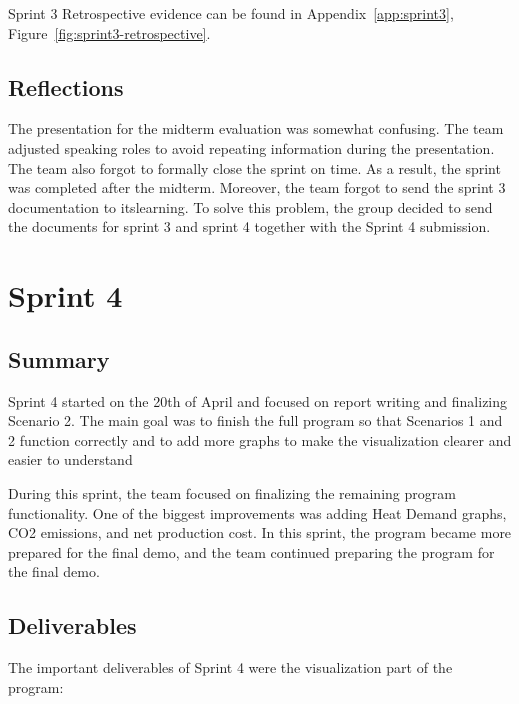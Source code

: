 Sprint 3 Retrospective evidence can be found in Appendix~\ref{app:sprint3}, Figure~\ref{fig:sprint3-retrospective}.

 

\subsection*{Reflections}

The presentation for the midterm evaluation was somewhat confusing. The team adjusted speaking roles to avoid repeating information during the presentation. The team also forgot to formally close the sprint on time. As a result, the sprint was completed after the midterm. Moreover, the team forgot to send the sprint 3 documentation to itslearning. To solve this problem, the group decided to send the documents for sprint 3 and sprint 4 together with the Sprint 4 submission.

 


\section{Sprint 4}

 

\subsection*{Summary}

Sprint 4 started on the 20th of April and focused on report writing and finalizing Scenario 2. The main goal was to finish the full program so that Scenarios 1 and 2 function correctly and to add more graphs to make the visualization clearer and easier to understand

During this sprint, the team focused on finalizing the remaining program functionality. One of the biggest improvements was adding Heat Demand graphs, CO2 emissions, and net production cost. In this sprint, the program became more prepared for the final demo, and the team continued preparing the program for the final demo.

\subsection*{Deliverables}

The important deliverables of Sprint 4 were the visualization part of the program: 

